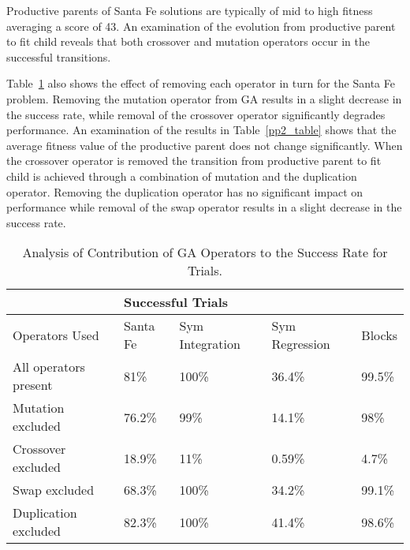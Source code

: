 Productive parents of Santa Fe solutions are typically of mid to high fitness averaging a score of 43. An examination of the evolution from productive parent to fit child reveals that both crossover and mutation operators occur in the successful transitions.

\label{operator_removal}Table~\ref{pp1_table} also shows the effect of removing each operator in turn for the Santa Fe problem. Removing the mutation operator from GA results in a slight decrease in the success rate, while removal of the crossover operator significantly degrades performance. An examination of the results in Table~\ref{pp2_table} shows that the average fitness value of the productive parent does not change significantly.  When the crossover operator is removed the transition from productive parent to fit child is achieved through a combination of mutation and the duplication operator. Removing the duplication operator has no significant impact on performance while removal of the swap operator results in a slight decrease in the success rate. 

\begin{table}[h]
\begin{center}
\begin{tabular}{|l|l|l|l|l|}
\hline
&\multicolumn{4}{|l|}{Successful Trials}\\
\hline
Operators Used  & Santa Fe & Sym Integration & Sym Regression & Blocks\\
\hline
All operators present  & 81\% &  100\% & 36.4\% & 99.5\%\\
Mutation excluded  & 76.2\% & 99\% & 14.1\% & 98\%\\
Crossover excluded & 18.9\% & 11\% & 0.59\% & 4.7\%\\
Swap excluded  & 68.3\% & 100\% & 34.2\% & 99.1\% \\
Duplication excluded & 82.3\% & 100\% & 41.4\% & 98.6\%\\

\hline
\end{tabular}
\caption{\label{pp1_table} Analysis of Contribution of GA Operators to the Success Rate for Trials.}
\end{center}
\end{table}



